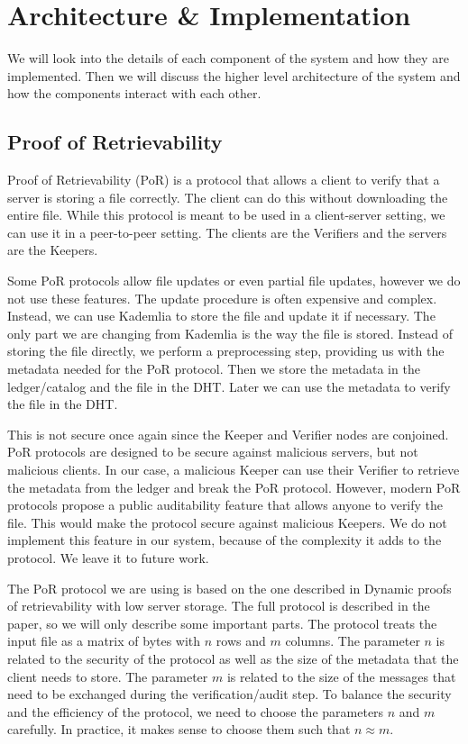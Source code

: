 \chapter{Architecture \& Implementation}
\label{chap:implementation}

We will look into the details of each component of the system and how they are implemented.
Then we will discuss the higher level architecture of the system and how the components interact with each other.

\section{Proof of Retrievability}

Proof of Retrievability\cite{porfirst} (PoR) is a protocol that allows a client to verify that a server is storing a file correctly.
The client can do this without downloading the entire file.
While this protocol is meant to be used in a client-server setting, we can use it in a peer-to-peer setting.
The clients are the Verifiers and the servers are the Keepers.

Some PoR protocols allow file updates or even partial file updates, however we do not use these features.
The update procedure is often expensive and complex.
Instead, we can use Kademlia to store the file and update it if necessary.
The only part we are changing from Kademlia is the way the file is stored.
Instead of storing the file directly, we perform a preprocessing step, providing us with the metadata needed for the PoR protocol.
Then we store the metadata in the ledger/catalog and the file in the DHT.
Later we can use the metadata to verify the file in the DHT.

This is not secure once again since the Keeper and Verifier nodes are conjoined.
PoR protocols are designed to be secure against malicious servers, but not malicious clients.
In our case, a malicious Keeper can use their Verifier to retrieve the metadata from the ledger and break the PoR protocol.
However, modern PoR protocols propose a public auditability feature that allows anyone to verify the file.
This would make the protocol secure against malicious Keepers.
We do not implement this feature in our system, because of the complexity it adds to the protocol.
We leave it to future work.

The PoR protocol we are using is based on the one described in Dynamic proofs of retrievability with low server storage\cite{poralgebra}.
The full protocol is described in the paper, so we will only describe some important parts.
The protocol treats the input file as a matrix of bytes with $n$ rows and $m$ columns.
The parameter $n$ is related to the security of the protocol as well as the size of the metadata that the client needs to store.
The parameter $m$ is related to the size of the messages that need to be exchanged during the verification/audit step.
To balance the security and the efficiency of the protocol, we need to choose the parameters $n$ and $m$ carefully.
In practice, it makes sense to choose them such that $n \approx m$.

